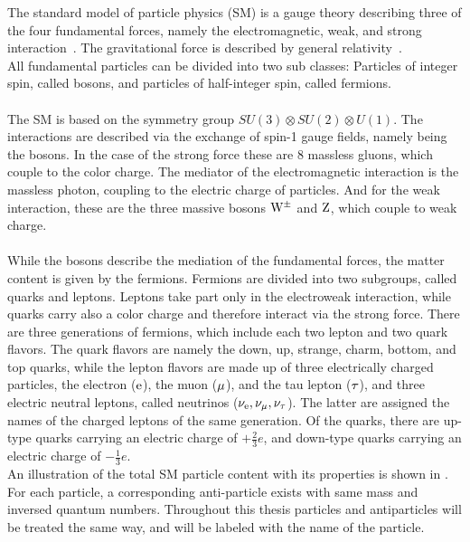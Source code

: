 The standard model of particle physics (SM) is a gauge theory describing three of the four fundamental forces, namely the electromagnetic, weak, and strong interaction~\cite{SM}. The gravitational force is described by general relativity~\cite{Einstein}.\\
All fundamental particles can be divided into two sub classes: Particles of integer spin, called bosons, and particles of half-integer spin, called fermions.\\\\
The SM is based on the symmetry group $SU(3)\otimes SU(2)\otimes U(1)$. The interactions are described via the exchange of spin-1 gauge fields, namely being the bosons. In the case of the strong force these are 8 massless gluons, which couple to the color charge. The mediator of the electromagnetic interaction is the massless photon, coupling to the electric charge of particles. And for the weak interaction, these are the three massive bosons $\mathrm{W}^\pm$ and $\mathrm{Z}$, which couple to weak charge.\\\\
While the bosons describe the mediation of the fundamental forces, the matter content is given by the fermions. Fermions are divided into two subgroups, called quarks and leptons. Leptons take part only in the electroweak interaction, while quarks carry also a color charge and therefore interact via the strong force. There are three generations of fermions, which include each two lepton and two quark flavors. The quark flavors are namely the down, up, strange, charm, bottom, and top quarks, while the lepton flavors are made up of three electrically charged particles, the electron ($\mathrm{e}$), the muon ($\mu$), and the tau lepton ($\tau$), and three electric neutral leptons, called neutrinos ($\nu_\mathrm{{e}},\nu_{\mu},\nu_{\tau}$). The latter are assigned the names of the charged leptons of the same generation. Of the quarks, there are up-type quarks carrying an electric charge of $+\frac{2}{3}e$, and down-type quarks carrying an electric charge of $-\frac{1}{3}e$.\\
An illustration of the total SM particle content with its properties is shown in .
For each particle, a corresponding anti-particle exists with same mass and inversed quantum numbers. Throughout this thesis particles and antiparticles will be treated the same way, and will be labeled with the name of the particle.\\

